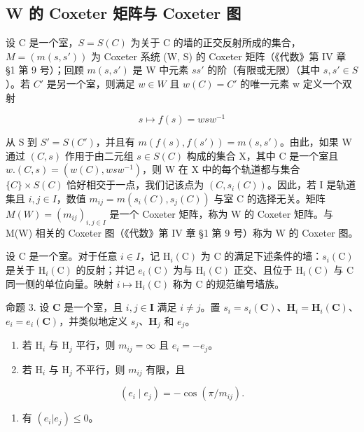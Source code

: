 \subsection{W 的 Coxeter 矩阵与 Coxeter 图}

设 C 是一个室，\(S = S(C)\) 为关于 C 的墙的正交反射所成的集合，\(M = (m(s, s'))\) 为 Coxeter 系统 (W, S) 的 Coxeter 矩阵（《代数》第 IV 章 §1 第 9 号）；回顾 \(m(s, s')\) 是 W 中元素 \(ss'\) 的阶（有限或无限）（其中 \(s, s' \in S\)）。若 \(C'\) 是另一个室，则满足 \(w \in W\) 且 \(w(C) = C'\) 的唯一元素 w 定义一个双射

\[
s \mapsto f (s) = w s w ^ {- 1}
\]

从 S 到 \(S' = S(C')\)，并且有 \(m(f(s), f(s')) = m(s, s')\)。由此，如果 W 通过 \((C, s)\) 作用于由二元组 \(s \in S(C)\) 构成的集合 X，其中 C 是一个室且 \(w.(C, s) = (w(C), wsw^{-1})\)，则 W 在 X 中的每个轨道都与集合 \(\{C\} \times S(C)\) 恰好相交于一点，我们记该点为 \((C, s_i(C))\)。因此，若 I 是轨道集且 \(i, j \in I\)，数值 \(m_{ij} = m(s_i(C), s_j(C))\) 与室 C 的选择无关。矩阵 \(M(W) = (m_{ij})_{i,j \in I}\) 是一个 Coxeter 矩阵，称为 W 的 Coxeter 矩阵。与 M(W) 相关的 Coxeter 图（《代数》第 IV 章 §1 第 9 号）称为 W 的 Coxeter 图。

设 C 是一个室。对于任意 \(i \in I\)，记 \(\mathrm{H}_{i}(\mathrm{C})\) 为 C 的满足下述条件的墙：\(s_{i}(\mathrm{C})\) 是关于 \(\mathrm{H}_{i}(\mathrm{C})\) 的反射；并记 \(e_{i}(\mathrm{C})\) 为与 \(\mathrm{H}_{i}(\mathrm{C})\) 正交、且位于 \(\mathrm{H}_{i}(\mathrm{C})\) 与 C 同一侧的单位向量。映射 \(i \mapsto \mathrm{H}_{i}(\mathrm{C})\) 称为 C 的规范编号墙族。

命题 3. 设 \(\mathbf{C}\) 是一个室，且 \(i, j \in \mathbf{I}\) 满足 \(i \neq j\)。置 \(s_i = s_i(\mathbf{C})\)、\(\mathbf{H}_i = \mathbf{H}_i(\mathbf{C})\)、\(e_i = e_i(\mathbf{C})\)，并类似地定义 \(s_j\)、\(\mathbf{H}_j\) 和 \(e_j\)。

\begin{enumerate}
\def\labelenumi{(\roman{enumi})}
\item
若 \(\mathrm{H}_i\) 与 \(\mathrm{H}_j\) 平行，则 \(m_{ij} = \infty\) 且 \(e_i = -e_j\)。
\item
若 \(\mathrm{H}_i\) 与 \(\mathrm{H}_j\) 不平行，则 \(m_{ij}\) 有限，且
\end{enumerate}

\[
\left(e _ {i} \mid e _ {j}\right) = - \cos (\pi / m _ {i j}).\tag{4}
\]

\begin{enumerate}
\def\labelenumi{(\roman{enumi})}
\setcounter{enumi}{2}
\tightlist
\item
有 \((e_i|e_j)\leqslant 0\)。
\end{enumerate}

